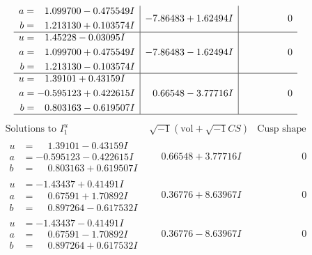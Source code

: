 \documentclass[1p]{elsarticle_modified}
\theoremstyle{definition}
\newcommand{\I}{\sqrt{-1}}
\begin{document}
$$\begin{array}{c|c|c}
\begin{aligned}
a &= \phantom{-}1.099700 - 0.475549 I \\
b &= \phantom{-}1.213130 + 0.103574 I\end{aligned}
 & -7.86483 + 1.62494 I & \phantom{-0.000000 } 0 \\ \hline\begin{aligned}
u &= \phantom{-}1.45228 - 0.03095 I \\
a &= \phantom{-}1.099700 + 0.475549 I \\
b &= \phantom{-}1.213130 - 0.103574 I\end{aligned}
 & -7.86483 - 1.62494 I & \phantom{-0.000000 } 0 \\ \hline\begin{aligned}
u &= \phantom{-}1.39101 + 0.43159 I \\
a &= -0.595123 + 0.422615 I \\
b &= \phantom{-}0.803163 - 0.619507 I\end{aligned}
 & \phantom{-}0.66548 - 3.77716 I & \phantom{-0.000000 } 0\\
 \hline 
 \end{array}$$\newpage$$\begin{array}{c|c|c}  
\text{Solutions to }I^u_{1}& \I (\text{vol} + \sqrt{-1}CS) & \text{Cusp shape}\\
 \hline 
\begin{aligned}
u &= \phantom{-}1.39101 - 0.43159 I \\
a &= -0.595123 - 0.422615 I \\
b &= \phantom{-}0.803163 + 0.619507 I\end{aligned}
 & \phantom{-}0.66548 + 3.77716 I & \phantom{-0.000000 } 0 \\ \hline\begin{aligned}
u &= -1.43437 + 0.41491 I \\
a &= \phantom{-}0.67591 + 1.70892 I \\
b &= \phantom{-}0.897264 - 0.617532 I\end{aligned}
 & \phantom{-}0.36776 + 8.63967 I & \phantom{-0.000000 } 0 \\ \hline\begin{aligned}
u &= -1.43437 - 0.41491 I \\
a &= \phantom{-}0.67591 - 1.70892 I \\
b &= \phantom{-}0.897264 + 0.617532 I\end{aligned}
 & \phantom{-}0.36776 - 8.63967 I & \phantom{-0.000000 } 0 \\ \hline\begin{aligned}

\end{aligned}
\end{array}$$
\end{document}
